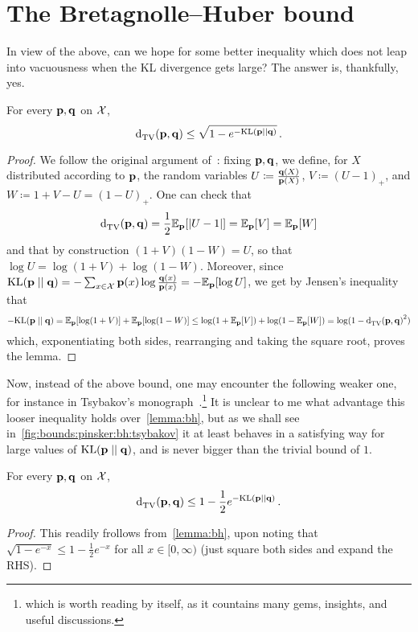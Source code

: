 \documentclass[10pt]{article}
\renewcommand{\eqdef}{\coloneqq}
\begin{document}
\section{The Bretagnolle--Huber bound}
In view of the above, can we hope for some better inequality which does not leap into vacuousness when the KL divergence gets large? The answer is, thankfully, yes.
  \label{sec:bh}
\begin{lemma}
  \label{lemma:bh}
For every $\mathbf{p},\mathbf{q}$ on $\mathcal{X}$, 
\begin{equation}
  \label{eq:bh}
  \totalvardist{\p}{\q} \leq \sqrt{1-e^{-\kldiv{\p}{\q}}}\,.
\end{equation}
\end{lemma}
\begin{proof}
We follow the original argument of~\cite[Lemma~2.1]{BretagnolleH78}: fixing $\mathbf{p},\mathbf{q}$, we define, for $X$ distributed according to $\mathbf{p}$, the random variables $U\eqdef \frac{\q(X)}{\p(X)}$, $V\eqdef (U-1)_+$, and $W\eqdef 1+V-U=(1-U)_+$. One can check that
\[
    \totalvardist{\p}{\q} = \frac{1}{2}\shortexpect_{\p}[\abs{U-1}] = \shortexpect_{\p}[V] = \shortexpect_{\p}[W]
\]
and that by construction $(1+V)(1-W)=U$, so that $\log U = \log(1+V)+\log(1-W)$. Moreover, since
$
  \kldiv{\p}{\q} = -\sum_{x\in\domain}\p(x)\log\frac{\q(x)}{\p(x)} = -\shortexpect_{\p}[\log U]
$, we get by Jensen's inequality that
\[
  -\kldiv{\p}{\q} = \shortexpect_{\p}[\log(1+V)]+\shortexpect_{\p}[\log(1-W)] \leq \log(1+\shortexpect_{\p}[V])+\log(1-\shortexpect_{\p}[W])
  = \log(1-\totalvardist{\p}{\q}^2)
\]
which, exponentiating both sides, rearranging and taking the square root, proves the lemma.
\end{proof}
Now, instead of the above bound, one may encounter the following weaker one, for instance in Tsybakov's monograph~\cite{Tsybakov09}.\footnote{which is worth reading by itself, as it countains many gems, insights, and useful discussions.} It is unclear to me what advantage this looser inequality holds over~\eqref{lemma:bh}, but as we shall see in~\autoref{fig:bounds:pinsker:bh:tsybakov} it at least behaves in a satisfying way for large values of $\kldiv{\p}{\q}$, and is never bigger than the trivial bound of $1$.
\begin{corollary}
  \label{lemma:bh:tsybakov}
For every $\mathbf{p},\mathbf{q}$ on $\mathcal{X}$, 
\begin{equation}
  \label{eq:bh:tsybakov}
  \totalvardist{\p}{\q} \leq 1-\frac{1}{2}e^{-\kldiv{\p}{\q}}\,.
\end{equation}
\end{corollary}
\begin{proof}
  This readily frollows from~\autoref{lemma:bh}, upon noting that $\sqrt{1-e^{-x}} \leq 1-\frac{1}{2}e^{-x}$ for all $x\in[0,\infty)$ (just square both sides and expand the RHS).
\end{proof}
\end{document}
